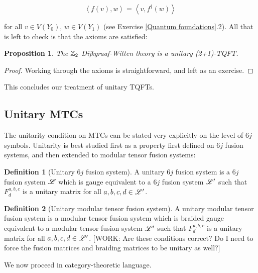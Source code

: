 \documentclass{article}
\newtheorem{proposition}{Proposition}[section]
\theoremstyle{definition}
\newtheorem*{definition}{Definition}
\numberwithin{figure}{section}
\begin{document}
$$\left<f(v),w\right>=\left<v,f^{\dagger}(w)\right>$$

for all $v\in V(Y_0)$, $w\in V(Y_1)$ (see Exercise \ref{Quantum foundations}.2). All that is left to check is that the axioms are satisfied:

\begin{proposition} The $\mathbb{Z}_2$ Dijkgraaf-Witten theory is a unitary (2+1)-TQFT.
\end{proposition}
\begin{proof} Working through the axioms is straightforward, and left as an exercise.
\end{proof}

This concludes our treatment of unitary TQFTs.

\subsection{Unitary MTCs}

The unitarity condition on MTCs can be stated very explicitly on the level of $6j$-symbols. Unitarity is best studied first as a property first defined on $6j$ fusion systems, and then extended to modular tensor fusion systems:

\begin{definition}[Unitary $6j$ fusion system] A unitary $6j$ fusion system is a $6j$ fusion system $\mathscr{L}$ which is gauge equivalent to a $6j$ fusion system $\mathscr{L}'$ such that $F^{a,b,c}_{d}$ is a unitary matrix for all $a,b,c,d\in \mathscr{L}'$.

\raggedleft\qedsymbol{}
\end{definition}


\begin{definition}[Unitary modular tensor fusion system] A unitary modular tensor fusion system is a modular tensor fusion system which is braided gauge equivalent to a modular tensor fusion system $\mathscr{L}'$ such that $F^{a,b,c}_{d}$ is a unitary matrix for all $a,b,c,d\in\mathscr{L}'$. [WORK: Are these conditions correct? Do I need to force the fusion matrices and braiding matrices to be unitary as well?]

\raggedleft\qedsymbol{}
\end{definition}

We now proceed in category-theoretic language.
\end{document}
